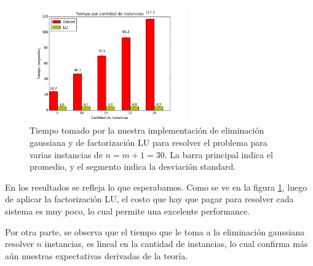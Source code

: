 \begin{figure}[H]
\centering  
 \includegraphics[width=0.6\textwidth]{imgs/tiempos_ninst.png}
 \caption{\footnotesize{Tiempo tomado por la nuestra implementación de eliminación gaussiana y de factorización LU para resolver el problema para varias instancias de $n = m+1 = 30$. La barra principal indica el promedio, y el segmento indica la desviación standard.}}
\label{fig:tiemponinst}
\end{figure}


En los resultados se refleja lo que esperabamos. Como se ve en la figura \ref{fig:tiemponinst}, luego de aplicar la factorización LU, el costo que hay que pagar para resolver cada sistema es muy poco, lo cual permite una excelente performance.

Por otra parte, se observa que el tiempo que le toma a la eliminación gaussiana resolver $n$ instancias, es lineal en la cantidad de instancias, lo cual confirma más aún nuestras expectativas derivadas de la teoría.





